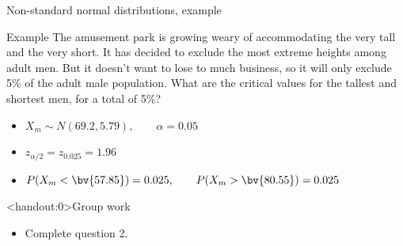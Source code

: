 \documentclass[xcolor=table, aspectratio=169, bigger, handout]{beamer}
\begin{document}
\begin{frame}{Non-standard normal distributions, example}
\begin{exampleblock}{Example}
The amusement park is growing weary of accommodating the very tall and the very short. It has decided to exclude the most extreme heights among adult men. But it doesn't want to lose to much business, so it will only exclude 5\% of the adult male population. What are the critical values for the tallest and shortest men, for a total of 5\%?
\begin{itemize} 
\pause\item $X_m \sim N(69.2, 5.79), \qquad \alpha = 0.05$
\pause\item $z_{\alpha/2} = z_{0.025} = 1.96$
\pause\item $P(X_m <  \bv{57.85}) = 0.025, \qquad P(X_m >  \bv{80.55}) = 0.025$
\end{itemize}

\end{exampleblock}
\end{frame}

\begin{frame}<handout:0>{Group work}
\begin{block}{}
\large
\begin{itemize}
\item Complete question 2.
\end{itemize}
\end{block}
\end{frame}
\end{document}
